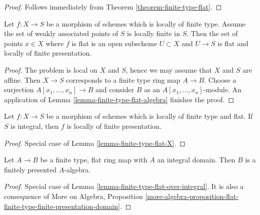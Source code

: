 \begin{proof}
Follows immediately from
Theorem \ref{theorem-finite-type-flat}.
\end{proof}

\begin{lemma}
\label{lemma-finite-type-flat-X}
Let $f : X \to S$ be a morphism of schemes which is locally of finite
type. Assume the set of weakly associated points of $S$ is locally finite
in $S$. Then the set of points $x \in X$ where $f$ is flat is an open
subscheme $U \subset X$ and $U \to S$ is flat and locally of finite
presentation.
\end{lemma}

\begin{proof}
The problem is local on $X$ and $S$, hence we may assume that
$X$ and $S$ are affine. Then $X \to S$ corresponds to a finite type
ring map $A \to B$. Choose a surjection $A[x_1, \ldots, x_n] \to B$
and consider $B$ as an $A[x_1, \ldots, x_n]$-module. An application of
Lemma \ref{lemma-finite-type-flat-algebra}
finishes the proof.
\end{proof}

\begin{lemma}
\label{lemma-finite-type-flat-over-integral}
Let $f : X \to S$ be a morphism of schemes which is
locally of finite type and flat. If $S$ is integral, then $f$
is locally of finite presentation.
\end{lemma}

\begin{proof}
Special case of
Lemma \ref{lemma-finite-type-flat-X}.
\end{proof}

\begin{lemma}
\label{lemma-finite-type-flat-over-integral-algebra}
Let $A \to B$ be a finite type, flat ring map with $A$ an integral
domain. Then $B$ is a finitely presented $A$-algebra.
\end{lemma}

\begin{proof}
Special case of
Lemma \ref{lemma-finite-type-flat-over-integral}.
It is also a consequence of
More on Algebra, Proposition
\ref{more-algebra-proposition-flat-finite-type-finite-presentation-domain}.
\end{proof}

